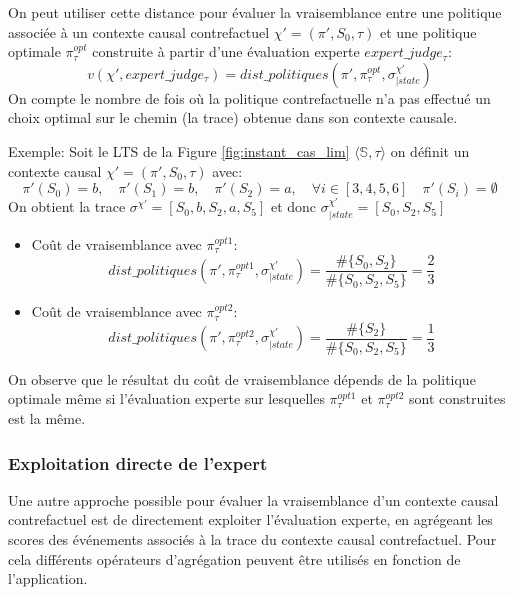 \documentclass[11pt]{extarticle}
\begin{document}
On peut utiliser cette distance pour évaluer la vraisemblance entre une politique associée à un contexte causal contrefactuel $\chi' = (\pi',S_0,\tau)$ et une politique optimale $\pi^{opt}_\tau$ construite à partir d'une évaluation experte $expert\_judge_\tau$:
\begin{equation}
    v(\chi',expert\_judge_\tau)= dist\_politiques(\pi',\pi^{opt}_\tau, \sigma^{\chi'}_{|state})
\end{equation}
On compte le nombre de fois où la politique contrefactuelle n'a pas effectué un choix optimal sur le chemin (la trace) obtenue dans son contexte causale.
\newline

Exemple: Soit le LTS de la Figure \ref{fig:instant_cas_lim} $\langle\mathds{S},\tau\rangle$ on définit un contexte causal $\chi'=(\pi',S_0,\tau)$ avec:
$$\pi'(S_0)= b,\quad \pi'(S_1) = b,\quad \pi'(S_2)=a,\quad \forall i\in[3,4,5,6]\quad  \pi'(S_i)=\emptyset$$
On obtient la trace $\sigma^{\chi'}=[S_0,b,S_2,a,S_5]$ et donc $\sigma_{|state}^{\chi'}=[S_0,S_2,S_5]$
\begin{itemize}
    \item Coût de vraisemblance avec $\pi^{opt1}_\tau$:
    \begin{equation*}
        dist\_politiques(\pi',\pi^{opt1}_\tau, \sigma^{\chi'}_{|state}) = \frac{\#{\{S_0,S_2\}}}{\#\{S_0,S_2,S_5\}} = \frac{2}{3}
    \end{equation*}
    
    \item Coût de vraisemblance avec $\pi^{opt2}_\tau$:
    \begin{equation*}
        dist\_politiques(\pi',\pi^{opt2}_\tau, \sigma^{\chi'}_{|state}) = \frac{\#{\{S_2\}}}{\#\{S_0,S_2,S_5\}} = \frac{1}{3}
    \end{equation*}
\end{itemize}
On observe que le résultat du coût de vraisemblance dépends de la politique optimale même si l'évaluation experte sur lesquelles $\pi^{opt1}_\tau$ et $\pi^{opt2}_\tau$ sont construites est la même.

\subsubsection{Exploitation directe de l'expert}
Une autre approche possible pour évaluer la vraisemblance d'un contexte causal contrefactuel est de directement exploiter l'évaluation experte, en agrégeant les scores des événements associés à la trace du contexte causal contrefactuel. Pour cela différents opérateurs d'agrégation peuvent être utilisés en fonction de l'application.
\end{document}
